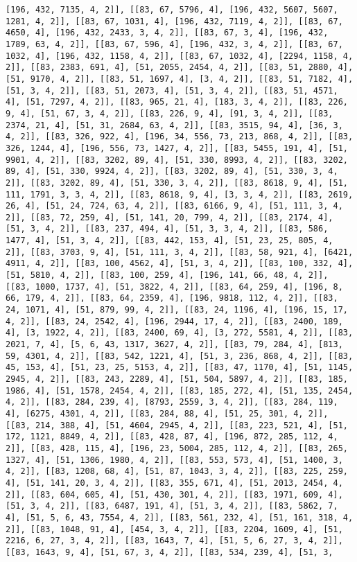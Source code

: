 \documentclass[12pt,fleqn]{article}\usepackage{../../common}
\begin{document}
\begin{verbatim}
[196, 432, 7135, 4, 2]], [[83, 67, 5796, 4], [196, 432, 5607, 5607, 1281, 4, 2]], [[83, 67, 1031, 4], [196, 432, 7119, 4, 2]], [[83, 67, 4650, 4], [196, 432, 2433, 3, 4, 2]], [[83, 67, 3, 4], [196, 432, 1789, 63, 4, 2]], [[83, 67, 596, 4], [196, 432, 3, 4, 2]], [[83, 67, 1032, 4], [196, 432, 1158, 4, 2]], [[83, 67, 1032, 4], [2294, 1158, 4, 2]], [[83, 2383, 691, 4], [51, 2055, 2454, 4, 2]], [[83, 51, 2880, 4], [51, 9170, 4, 2]], [[83, 51, 1697, 4], [3, 4, 2]], [[83, 51, 7182, 4], [51, 3, 4, 2]], [[83, 51, 2073, 4], [51, 3, 4, 2]], [[83, 51, 4571, 4], [51, 7297, 4, 2]], [[83, 965, 21, 4], [183, 3, 4, 2]], [[83, 226, 9, 4], [51, 67, 3, 4, 2]], [[83, 226, 9, 4], [91, 3, 4, 2]], [[83, 2374, 21, 4], [51, 31, 2684, 63, 4, 2]], [[83, 3515, 94, 4], [36, 3, 4, 2]], [[83, 326, 922, 4], [196, 34, 556, 73, 213, 868, 4, 2]], [[83, 326, 1244, 4], [196, 556, 73, 1427, 4, 2]], [[83, 5455, 191, 4], [51, 9901, 4, 2]], [[83, 3202, 89, 4], [51, 330, 8993, 4, 2]], [[83, 3202, 89, 4], [51, 330, 9924, 4, 2]], [[83, 3202, 89, 4], [51, 330, 3, 4, 2]], [[83, 3202, 89, 4], [51, 330, 3, 4, 2]], [[83, 8618, 9, 4], [51, 111, 1791, 3, 3, 4, 2]], [[83, 8618, 9, 4], [3, 3, 4, 2]], [[83, 2619, 26, 4], [51, 24, 724, 63, 4, 2]], [[83, 6166, 9, 4], [51, 111, 3, 4, 2]], [[83, 72, 259, 4], [51, 141, 20, 799, 4, 2]], [[83, 2174, 4], [51, 3, 4, 2]], [[83, 237, 494, 4], [51, 3, 3, 4, 2]], [[83, 586, 1477, 4], [51, 3, 4, 2]], [[83, 442, 153, 4], [51, 23, 25, 805, 4, 2]], [[83, 3703, 9, 4], [51, 111, 3, 4, 2]], [[83, 58, 921, 4], [6421, 4911, 4, 2]], [[83, 100, 4562, 4], [51, 3, 4, 2]], [[83, 100, 332, 4], [51, 5810, 4, 2]], [[83, 100, 259, 4], [196, 141, 66, 48, 4, 2]], [[83, 1000, 1737, 4], [51, 3822, 4, 2]], [[83, 64, 259, 4], [196, 8, 66, 179, 4, 2]], [[83, 64, 2359, 4], [196, 9818, 112, 4, 2]], [[83, 24, 1071, 4], [51, 879, 99, 4, 2]], [[83, 24, 1196, 4], [196, 15, 17, 4, 2]], [[83, 24, 2542, 4], [196, 2944, 17, 4, 2]], [[83, 2400, 189, 4], [3, 1922, 4, 2]], [[83, 2400, 69, 4], [3, 272, 5581, 4, 2]], [[83, 2021, 7, 4], [5, 6, 43, 1317, 3627, 4, 2]], [[83, 79, 284, 4], [813, 59, 4301, 4, 2]], [[83, 542, 1221, 4], [51, 3, 236, 868, 4, 2]], [[83, 45, 153, 4], [51, 23, 25, 5153, 4, 2]], [[83, 47, 1170, 4], [51, 1145, 2945, 4, 2]], [[83, 243, 2289, 4], [51, 504, 5897, 4, 2]], [[83, 185, 1986, 4], [51, 1578, 2454, 4, 2]], [[83, 185, 272, 4], [51, 135, 2454, 4, 2]], [[83, 284, 239, 4], [8793, 2559, 3, 4, 2]], [[83, 284, 119, 4], [6275, 4301, 4, 2]], [[83, 284, 88, 4], [51, 25, 301, 4, 2]], [[83, 214, 388, 4], [51, 4604, 2945, 4, 2]], [[83, 223, 521, 4], [51, 172, 1121, 8849, 4, 2]], [[83, 428, 87, 4], [196, 872, 285, 112, 4, 2]], [[83, 428, 115, 4], [196, 23, 5004, 285, 112, 4, 2]], [[83, 265, 1327, 4], [51, 1306, 1980, 4, 2]], [[83, 553, 573, 4], [51, 1400, 3, 4, 2]], [[83, 1208, 68, 4], [51, 87, 1043, 3, 4, 2]], [[83, 225, 259, 4], [51, 141, 20, 3, 4, 2]], [[83, 355, 671, 4], [51, 2013, 2454, 4, 2]], [[83, 604, 605, 4], [51, 430, 301, 4, 2]], [[83, 1971, 609, 4], [51, 3, 4, 2]], [[83, 6487, 191, 4], [51, 3, 4, 2]], [[83, 5862, 7, 4], [51, 5, 6, 43, 7554, 4, 2]], [[83, 561, 232, 4], [51, 161, 318, 4, 2]], [[83, 1048, 91, 4], [454, 3, 4, 2]], [[83, 2204, 1609, 4], [51, 2216, 6, 27, 3, 4, 2]], [[83, 1643, 7, 4], [51, 5, 6, 27, 3, 4, 2]], [[83, 1643, 9, 4], [51, 67, 3, 4, 2]], [[83, 534, 239, 4], [51, 3, 
\end{verbatim}
\end{document}
